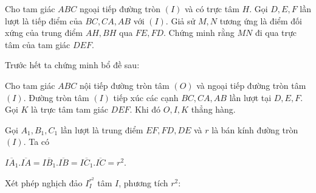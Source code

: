 \begin{bt}%
	Cho tam giác $ABC$ ngoại tiếp đường tròn $(I)$ và có trực tâm $H$. Gọi $D,E,F$ lần lượt là tiếp điểm của $BC,CA,AB$ với $(I)$. Giả sử $M,N$ tương ứng là điểm đối xứng của trung điểm $AH,BH$ qua $FE,FD$. Chứng minh rằng $MN$ đi qua trực tâm của tam giác $DEF$.
	\loigiai
	{
		Trước hết ta chứng minh bổ đề sau:
		\begin{bode}
			Cho tam giác $ABC$ nội tiếp đường tròn tâm $(O)$ và ngoại tiếp đường tròn tâm $(I)$. Đường tròn tâm $(I)$ tiếp xúc các cạnh $BC,CA,AB$ lần lượt tại $D,E,F$. Gọi $K$ là trực tâm tam giác $DEF$. Khi đó $O,I,K$ thẳng hàng.
		\end{bode}	
		\begin{center}
		\end{center}
		Gọi $A_1,B_1,C_1$ lần lượt là trung điểm $EF,FD,DE$ và $r$ là bán kính đường tròn $(I)$. Ta có
		\begin{center}
			$\overline{IA_1}.\overline{IA}=\overline{IB_1}.\overline{IB}=\overline{IC_1}.\overline{IC}=r^2$.
		\end{center}
		Xét phép nghịch đảo $I_I^{r^2}$ tâm $I$, phương tích $r^2$:
}
\end{bt}

